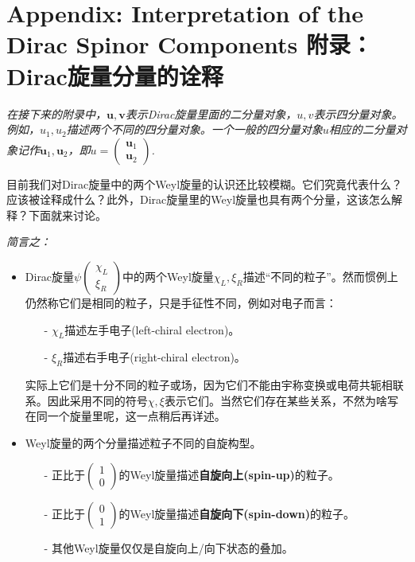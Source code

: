 \section[附录：Dirac旋量分量的诠释]{Appendix: Interpretation of the Dirac Spinor Components \quad 附录：Dirac旋量分量的诠释}\label{sec8.8}
{\itshape 在接下来的附录中，$\mathbf{u}, \mathbf{v}$表示Dirac旋量里面的二分量对象，$u, v$表示四分量对象。例如，$u_1, u_2$描述两个不同的四分量对象。一个一般的四分量对象$u$相应的二分量对象记作$\mathbf{u}_1, \mathbf{u}_2$，即$u = \begin{pmatrix} \mathbf{u}_1 \\ \mathbf{u}_2 \end{pmatrix}$.
}

目前我们对Dirac旋量中的两个Weyl旋量的认识还比较模糊。它们究竟代表什么？应该被诠释成什么？此外，Dirac旋量里的Weyl旋量也具有两个分量，这该怎么解释？下面就来讨论。

{\itshape 简言之：}

\begin{itemize}
\item Dirac旋量$\psi \begin{pmatrix} \chi_L \\ \xi_R \end{pmatrix}$中的两个Weyl旋量$\chi_L, \xi_R$描述“不同的粒子”。然而惯例上仍然称它们是相同的粒子，只是手征性不同，例如对电子而言：
\begin{itemize}
\item[-] $\chi_L$描述左手电子(left-chiral electron)。
\item[-] $\xi_R$描述右手电子(right-chiral electron)。
\end{itemize}
实际上它们是十分不同的粒子或场，因为它们不能由宇称变换或电荷共轭相联系。因此采用不同的符号$\chi, \xi$表示它们。当然它们存在某些关系，不然为啥写在同一个旋量里呢，这一点稍后再详述。

\item Weyl旋量的两个分量描述粒子不同的自旋构型。
\begin{itemize}
\item[-] 正比于$\begin{pmatrix} 1 \\ 0 \end{pmatrix}$的Weyl旋量描述{\bfseries 自旋向上(spin-up)}的粒子。
\item[-] 正比于$\begin{pmatrix} 0 \\ 1 \end{pmatrix}$的Weyl旋量描述{\bfseries 自旋向下(spin-down)}的粒子。
\item[-] 其他Weyl旋量仅仅是自旋向上/向下状态的叠加。
\end{itemize}
\end{itemize}

